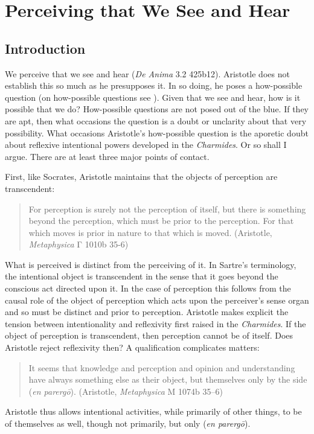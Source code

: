 \chapter{Perceiving that We See and Hear} %
\label{cha:perceiving}

\section{Introduction} %
\label{sec:introduction2}

We perceive that we see and hear (\emph{De Anima} 3.2 425b12). Aristotle does not establish this so much as he presupposes it. In so doing, he poses a how-possible question (on how-possible questions see \citealt{Cassam:2007lq}). Given that we see and hear, how is it possible that we do? How-possible questions are not posed out of the blue. If they are apt, then what occasions the question is a doubt or unclarity about that very possibility. What occasions Aristotle's how-possible question is the aporetic doubt about reflexive intentional powers developed in the \emph{Charmides}. Or so shall I argue. There are at least three major points of contact. 

First, like Socrates, Aristotle maintains that the objects of perception are transcendent:
\begin{quote}
	For perception is surely not the perception of itself, but there is something beyond the perception, which must be prior to the perception. For that which moves is prior in nature to that which is moved. (Aristotle, \emph{Metaphysica} {\sbl Γ} 1010b 35-6)
\end{quote}
What is perceived is distinct from the perceiving of it. In Sartre's terminology, the intentional object is transcendent in the sense that it goes beyond the conscious act directed upon it. In the case of perception this follows from the causal role of the object of perception which acts upon the perceiver's sense organ and so must be distinct and prior to perception. Aristotle makes explicit the tension between intentionality and reflexivity first raised in the \emph{Charmides}. If the object of perception is transcendent, then perception cannot be of itself. Does Aristotle reject reflexivity then? A qualification complicates matters:
\begin{quote}
	It seems that knowledge and perception and opinion and understanding have always something else as their object, but themselves only by the side (\emph{en parergō}). (Aristotle, \emph{Metaphysica} {\sbl Μ} 1074b 35–6)
\end{quote}
Aristotle thus allows intentional activities, while primarily of other things, to be of themselves as well, though not primarily, but only (\emph{en parergō}).


